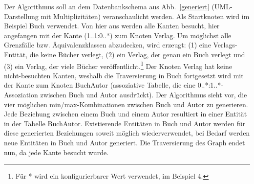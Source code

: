 	
Der Algorithmus soll an dem  Datenbankschema  aus Abb.~\ref{generiert} (UML-Darstellung mit Multiplizitäten) veranschaulicht werden. 
%
%	
%	
Als Startknoten wird im Beispiel Buch verwendet. 
%
Von hier aus werden alle Kanten besucht, hier angefangen mit der Kante (1..1:0..*) zum Knoten Verlag. 
%
%
Um möglichst alle Grenzfälle bzw. Äquivalenzklassen abzudecken, wird erzeugt: (1) eine Verlags-Entität, die keine Bücher verlegt, (2) ein Verlag, der genau ein Buch verlegt und (3) ein  Verlag, der viele
Bücher veröffentlicht.\footnote{Für * wird ein konfigurierbarer Wert  verwendet, im Beispiel $4$.}
%
%
%	
 Der Knoten Verlag hat keine nicht-besuchten Kanten, weshalb die Traversierung in Buch fortgesetzt wird mit der Kante zum Knoten BuchAutor (assoziative Tabelle, die eine 0..*:1..*-Assoziation zwischen Buch und Autor ausdrückt). 
%
%
%
Der Algorithmus sieht vor, die vier möglichen min/max-Kombinationen zwischen Buch und Autor zu generieren. 
%
Jede Beziehung zwischen einem Buch und einem Autor resultiert in einer Entität in der Tabelle BuchAutor. 
%
Existierende Entitäten in Buch und Autor werden für diese generierten Beziehungen soweit möglich wiederverwendet, bei Bedarf werden neue Entitäten in Buch und Autor generiert.
%
Die Traversierung des Graph endet nun, da jede Kante besucht wurde.
%
%
